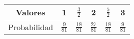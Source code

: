 \documentclass{article}
\begin{document}
    \begin{table}[H]
      \centering
      \begin{tabular}{ c | c c c c c|}
        Valores       & 1               & $\frac{3}{2}$   & 2               & $\frac{5}{2}$   & 3               \\ \hline
        Probabilidad  & $\frac{9}{81}$  & $\frac{18}{81}$ & $\frac{27}{81}$ & $\frac{18}{81}$ & $\frac{9}{81}$
      \end{tabular}
      \caption{}
      \label{}
    \end{table}

  \nocite{prob2017}


  
  
\end{document}
